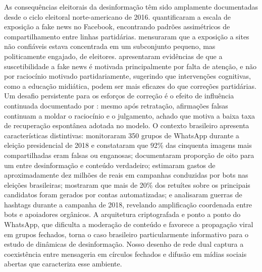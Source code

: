 \documentclass[12pt,a4paper]{article}
\theoremstyle{definition}
\theoremstyle{plain}
\begin{document}
As consequências eleitorais da desinformação têm sido amplamente documentadas desde o ciclo eleitoral norte-americano de 2016. \citet{allcott2017social} quantificaram a escala de exposição a fake news no Facebook, encontrando padrões assimétricos de compartilhamento entre linhas partidárias. \citet{guess2020exposure} mensuraram que a exposição a sites não confiáveis estava concentrada em um subconjunto pequeno, mas politicamente engajado, de eleitores. \citet{pennycook2021psychology} apresentaram evidências de que a suscetibilidade a fake news é motivada principalmente por falta de atenção, e não por raciocínio motivado partidariamente, sugerindo que intervenções cognitivas, como a educação midiática, podem ser mais eficazes do que correções partidárias. Um desafio persistente para os esforços de correção é o efeito de influência continuada documentado por \citet{lewandowsky2012misinformation}: mesmo após retratação, afirmações falsas continuam a moldar o raciocínio e o julgamento, achado que motiva a baixa taxa de recuperação espontânea adotada no modelo. O contexto brasileiro apresenta características distintivas: \citet{machado2019whatsapp} monitoraram 350 grupos de WhatsApp durante a eleição presidencial de 2018 e constataram que 92\% das cinquenta imagens mais compartilhadas eram falsas ou enganosas; \citet{resende2019misinformation} documentaram proporção de oito para um entre desinformação e conteúdo verdadeiro; \citet{arnaudo2017computational} estimaram gastos de aproximadamente dez milhões de reais em campanhas conduzidas por bots nas eleições brasileiras; \citet{ruediger2018bots} mostraram que mais de 20\% dos retuítes sobre os principais candidatos foram gerados por contas automatizadas; e \citet{soares2021hashtag} analisaram guerras de hashtags durante a campanha de 2018, revelando amplificação coordenada entre bots e apoiadores orgânicos. A arquitetura criptografada e ponto a ponto do WhatsApp, que dificulta a moderação de conteúdo e favorece a propagação viral em grupos fechados, torna o caso brasileiro particularmente informativo para o estudo de dinâmicas de desinformação. Nosso desenho de rede dual captura a coexistência entre mensageria em círculos fechados e difusão em mídias sociais abertas que caracteriza esse ambiente.
\end{document}
